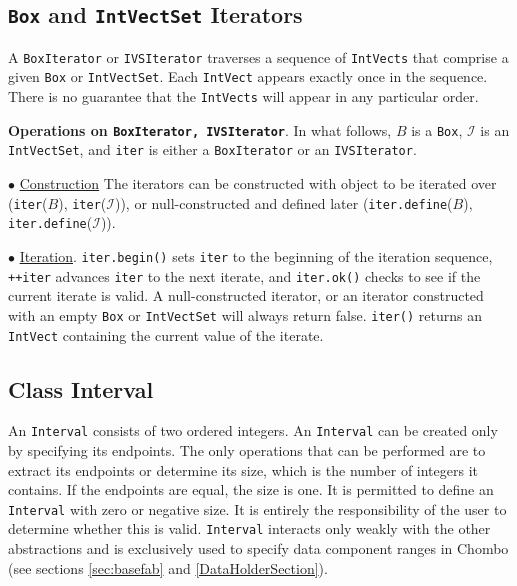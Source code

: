 \subsection{{\tt Box} and {\tt IntVectSet} Iterators}

A {\tt{BoxIterator}} or {\tt{IVSIterator}} traverses a sequence of
{\tt{IntVects}} that comprise a given {\tt{Box}} or
{\tt{IntVectSet}}.  Each {\tt{IntVect}} appears exactly once in the
sequence.  There is no guarantee that the {\tt{IntVects}} will
appear in any particular order.

\noindent
{\bf{Operations on {\tt{BoxIterator,
IVSIterator}}}}.  In what follows, $B$ is a {\tt{Box}}, $\mathcal{I}$ is an
{\tt{IntVectSet}}, and {\tt{iter}} is either a {\tt{BoxIterator}} or an
{\tt{IVSIterator}}.

\begin{trivlist}
\item $\bullet$ \underline{Construction}  The iterators can be
constructed with object to be iterated over ({\tt iter}($B$),
{\tt iter}($\mathcal{I}$)), or null-constructed and defined later
({\tt iter.define}($B$), {\tt iter.define}($\mathcal{I}$)).

\item $\bullet$ \underline{Iteration}.  {\tt iter.begin()} sets
{\tt iter} to the beginning of the iteration sequence, {\tt ++iter}
advances {\tt iter} to the next iterate, and {\tt iter.ok()} checks to
see if the current iterate is valid.  A null-constructed iterator, or
an iterator constructed with an empty {\tt{Box}} or {\tt{IntVectSet}}
will always return false.  {\tt iter()} returns an {\tt IntVect}
containing the current value of the iterate.

\end{trivlist}

\subsection{Class Interval}
\label{sec:interval}

An \verb|Interval| consists of two ordered integers.  An \verb|Interval|
can be created only by specifying its endpoints.  The only operations that
can be performed are to extract its endpoints or determine its size, which
is the number of integers it contains.  If the endpoints are equal, the
size is one.  It is permitted to define an \verb|Interval| with zero
or negative size.  It is entirely the responsibility of the user to
determine whether this is valid.  \verb|Interval| interacts only
weakly with the other abstractions and is exclusively used to specify
data component ranges in Chombo (see sections \ref{sec:basefab} and
\ref{DataHolderSection}).

